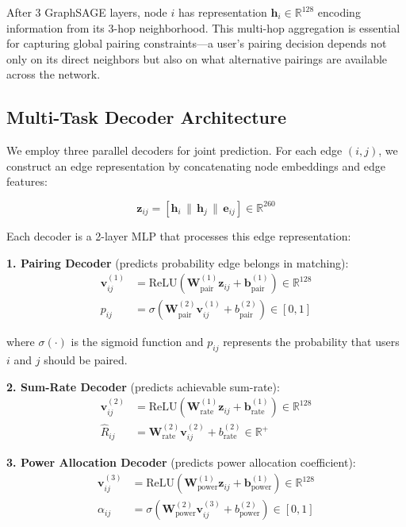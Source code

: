 After 3 GraphSAGE layers, node $i$ has representation $\mathbf{h}_i \in \mathbb{R}^{128}$ encoding information from its 3-hop neighborhood. This multi-hop aggregation is essential for capturing global pairing constraints—a user's pairing decision depends not only on its direct neighbors but also on what alternative pairings are available across the network.

\subsection{Multi-Task Decoder Architecture}

We employ three parallel decoders for joint prediction. For each edge $(i,j)$, we construct an edge representation by concatenating node embeddings and edge features:

\begin{equation}
\mathbf{z}_{ij} = [\mathbf{h}_i \,\|\, \mathbf{h}_j \,\|\, \mathbf{e}_{ij}] \in \mathbb{R}^{260}
\end{equation}

Each decoder is a 2-layer MLP that processes this edge representation:

\textbf{1. Pairing Decoder} (predicts probability edge belongs in matching):
\begin{align}
\mathbf{v}_{ij}^{(1)} &= \text{ReLU}(\mathbf{W}_{\text{pair}}^{(1)} \mathbf{z}_{ij} + \mathbf{b}_{\text{pair}}^{(1)}) \in \mathbb{R}^{128} \\
p_{ij} &= \sigma(\mathbf{W}_{\text{pair}}^{(2)} \mathbf{v}_{ij}^{(1)} + b_{\text{pair}}^{(2)}) \in [0,1]
\end{align}

where $\sigma(\cdot)$ is the sigmoid function and $p_{ij}$ represents the probability that users $i$ and $j$ should be paired.

\textbf{2. Sum-Rate Decoder} (predicts achievable sum-rate):
\begin{align}
\mathbf{v}_{ij}^{(2)} &= \text{ReLU}(\mathbf{W}_{\text{rate}}^{(1)} \mathbf{z}_{ij} + \mathbf{b}_{\text{rate}}^{(1)}) \in \mathbb{R}^{128} \\
\hat{R}_{ij} &= \mathbf{W}_{\text{rate}}^{(2)} \mathbf{v}_{ij}^{(2)} + b_{\text{rate}}^{(2)} \in \mathbb{R}^+
\end{align}

\textbf{3. Power Allocation Decoder} (predicts power allocation coefficient):
\begin{align}
\mathbf{v}_{ij}^{(3)} &= \text{ReLU}(\mathbf{W}_{\text{power}}^{(1)} \mathbf{z}_{ij} + \mathbf{b}_{\text{power}}^{(1)}) \in \mathbb{R}^{128} \\
\alpha_{ij} &= \sigma(\mathbf{W}_{\text{power}}^{(2)} \mathbf{v}_{ij}^{(3)} + b_{\text{power}}^{(2)}) \in [0,1]
\end{align}

